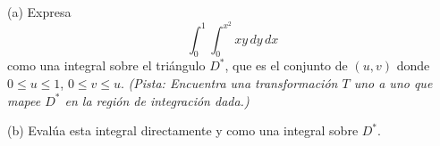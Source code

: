 (a) Expresa 
\[
\int_0^1 \int_0^{x^2} xy \, dy \, dx
\]
como una integral sobre el triángulo \( D^* \), que es el conjunto de \( (u, v) \) donde \( 0 \leq u \leq 1 \), \( 0 \leq v \leq u \). 
\textit{(Pista: Encuentra una transformación \( T \) uno a uno que mapee \( D^* \) en la región de integración dada.)}

(b) Evalúa esta integral directamente y como una integral sobre \( D^* \).
